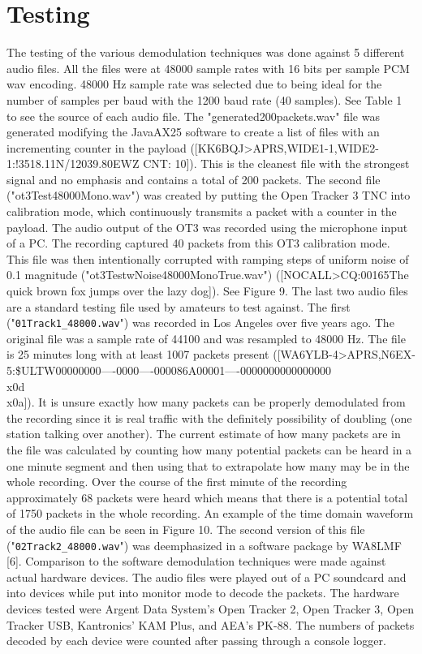 \chapter{Testing}

The testing of the various demodulation techniques was done against 5 different audio files. All the files were at 48000 sample rates with 16 bits per sample PCM wav encoding. 48000 Hz sample rate was selected due to being ideal for the number of samples per baud with the 1200 baud rate (40 samples). See Table 1 to see the source of each audio file. The "generated200packets.wav" file was generated modifying the JavaAX25 software to create a list of files with an incrementing counter in the payload ([KK6BQJ>APRS,WIDE1-1,WIDE2-1:!3518.11N/12039.80EWZ CNT: 10]). This is the cleanest file with the strongest signal and no emphasis and contains a total of 200 packets. The second file ("ot3Test48000Mono.wav") was created by putting the Open Tracker 3 TNC into calibration mode, which continuously transmits a packet with a counter in the payload. The audio output of the OT3 was recorded using the microphone input of a PC. The recording captured 40 packets from this OT3 calibration mode. This file was then intentionally corrupted with ramping steps of uniform noise of 0.1 magnitude ("ot3TestwNoise48000MonoTrue.wav") ([NOCALL>CQ:00165The quick brown fox jumps over the lazy dog]). See Figure 9.  The last two audio files are a standard testing file used by amateurs to test against. The first ("\verb|01Track1_48000.wav|") was recorded in Los Angeles over five years ago. The original file was a sample rate of 44100 and was resampled to 48000 Hz. The file is 25 minutes long with at least 1007 packets present ([WA6YLB-4>APRS,N6EX-5:\$ULTW00000000----0000----000086A00001----0000000000000000\\x0d\\x0a]). It is unsure exactly how many packets can be properly demodulated from the recording since it is real traffic with the definitely possibility of doubling (one station talking over another). The current estimate of how many packets are in the file was calculated by counting how many potential packets can be heard in a one minute segment and then using that to extrapolate how many may be in the whole recording. Over the course of the first minute of the recording approximately 68 packets were heard which means that there is a potential total of 1750 packets in the whole recording. An example of the time domain waveform of the audio file can be seen in Figure 10. The second version of this file ("\verb|02Track2_48000.wav|") was deemphasized in a software package by WA8LMF [6]. Comparison to the software demodulation techniques were made against actual hardware devices. The audio files were played out of a PC soundcard and into devices while put into monitor mode to decode the packets. The hardware devices tested were Argent Data System's Open Tracker 2, Open Tracker 3, Open Tracker USB, Kantronics' KAM Plus, and AEA's PK-88. The numbers of packets decoded by each device were counted after passing through a console logger.
